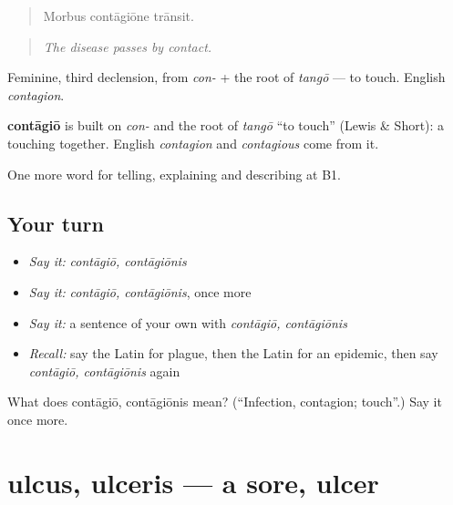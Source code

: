 \begin{quote}
Morbus contāgiōne trānsit.
\end{quote}

\begin{quote}
\emph{The disease passes by contact.}
\end{quote}

Feminine, third declension, from \emph{con-} + the root of \emph{tangō} — to touch. English \emph{contagion}.

\begin{cousinweb}
\textbf{contāgiō} is built on \emph{con-} and the root of \emph{tangō} \textquotedblleft{}to touch\textquotedblright{} (Lewis \& Short): a touching together. English \emph{contagion} and \emph{contagious} come from it.
\end{cousinweb}

\begin{grammarlens}[title={What you've built}]
One more word for telling, explaining and describing at B1.
\end{grammarlens}

\subsection*{Your turn}
\begin{itemize}
\raggedright
  \item \emph{Say it:} \emph{contāgiō, contāgiōnis}
  \item \emph{Say it:} \emph{contāgiō, contāgiōnis}, once more
  \item \emph{Say it:} a sentence of your own with \emph{contāgiō, contāgiōnis}
  \item \emph{Recall:} say the Latin for plague, then the Latin for an epidemic, then say \emph{contāgiō, contāgiōnis} again
\end{itemize}

\begin{tcolorbox}[breakable,colback=teal!4,colframe=teal!35!black,title={Before you move on}]
What does contāgiō, contāgiōnis mean? (\textquotedblleft{}Infection, contagion; touch\textquotedblright{}.) Say it once more.
\end{tcolorbox}
\section[ulcus, ulceris]{ulcus, ulceris — a sore, ulcer}

\label{lesson:LA-C524-ulcus}



